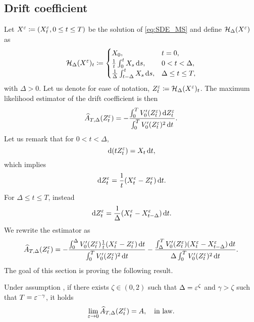\documentclass[10pt]{article}
\begin{document}
\subsection{Drift coefficient}
Let $X^\varepsilon \coloneqq (X^\varepsilon_t, 0\leq t \leq T)$ be the solution of \eqref{eq:SDE_MS} and define $\mathcal H_\Delta(X^\varepsilon)$ as
\begin{equation}\label{eq:ContMovingAverage}
	\mathcal H_\Delta(X^\varepsilon)_t \coloneqq 
	\begin{cases} 
	X_0, &t = 0, \\
	\frac1t \int_0^t X_s \,\mathrm{d} s, &0 < t < \Delta, \\
	\frac1\Delta \int_{t-\Delta}^t X_s \,\mathrm{d} s, &\Delta \leq t \leq T,\\
	\end{cases}
\end{equation}
with $\Delta > 0$. Let us denote for ease of notation, $Z^\varepsilon_t \coloneqq \mathcal H_\Delta(X^\varepsilon)_t$. The maximum likelihood estimator of the drift coefficient is then
\begin{equation}
	\widehat A_{T, \Delta}(Z_t^\varepsilon) = - \frac{\int_0^T V_0'(Z^\varepsilon_t) \,\mathrm{d} Z^\varepsilon_t}{\int_0^T V_0'(Z^\varepsilon_t)^2 \,\mathrm{d} t}.
\end{equation}
Let us remark that for $0 < t < \Delta$, 
\begin{equation}
	\,\mathrm{d} (t Z^\varepsilon_t) = X_t \,\mathrm{d} t,
\end{equation}
which implies 
\begin{equation}
	\,\mathrm{d} Z^\varepsilon_t = \frac1t (X^\varepsilon_t - Z^\varepsilon_t) \,\mathrm{d} t.
\end{equation}
For $\Delta \leq t \leq T$, instead
\begin{equation}
	\,\mathrm{d} Z^\varepsilon_t = \frac1\Delta (X^\varepsilon_t - X^\varepsilon_{t-\Delta}) \,\mathrm{d} t.
\end{equation}
We rewrite the estimator as
\begin{equation}
	\widehat A_{T, \Delta}(Z_t^\varepsilon) = -\frac{\int_0^\Delta V_0'(Z^\varepsilon_t) \frac1t (X^\varepsilon_t - Z^\varepsilon_t) \,\mathrm{d} t}{\int_0^T V_0'(Z^\varepsilon_t)^2 \,\mathrm{d} t} -\frac{\int_\Delta^T V_0'(Z^\varepsilon_t) (X^\varepsilon_t - X^\varepsilon_{t-\Delta}) \,\mathrm{d} t}{\Delta\int_0^T V_0'(Z^\varepsilon_t)^2 \,\mathrm{d} t}.
\end{equation}
The goal of this section is proving the following result.
\begin{theorem}\label{thm:DriftContinuous} Under assumption , if there exists $\zeta \in (0, 2)$ such that $\Delta = \varepsilon^{\zeta}$ and $\gamma > \zeta$ such that $T = \varepsilon^{-\gamma}$, it holds 
\begin{equation}
	\lim_{\varepsilon\to 0} \widehat A_{T, \Delta}(Z_t^\varepsilon) = A, \quad \text{in law}.
\end{equation}
\end{theorem}
\end{document}
